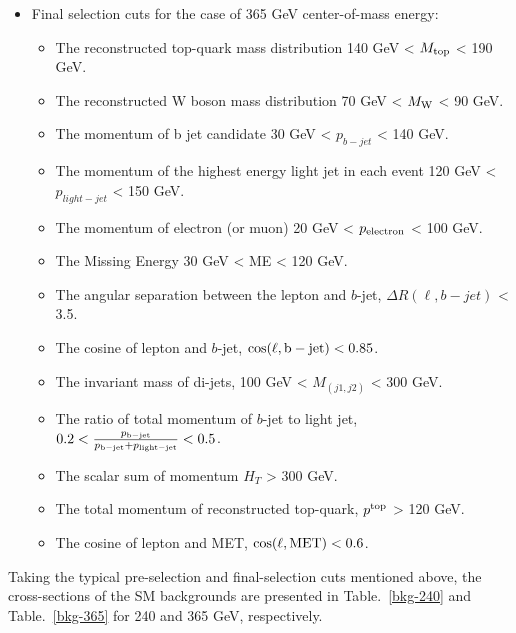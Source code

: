 \documentclass[11pt,onecolumn,english,showpacs,preprintnumbers,amsmath,amssymb,floatfix,nofootinbib]{revtex4-1}
\begin{document}
\begin{itemize}
\item Final selection cuts for the case of 365 GeV center-of-mass energy:
\begin{itemize}
\item The reconstructed top-quark mass distribution 140 GeV < $M_{\rm top}$ < 190 GeV.   
\item The reconstructed W boson mass distribution  70 GeV < $M_{\rm W}$ < 90 GeV.      
\item The momentum of b jet candidate  30 GeV < $p_{b-jet}$ < 140 GeV. 
\item The momentum of the highest energy light jet in each event 120 GeV < $p_{light-jet}$ < 150 GeV.
\item The momentum of electron (or muon)  20 GeV < $p_{\rm electron}$ < 100 GeV.   
\item The Missing Energy 30 GeV < ME < 120 GeV.   
\item The angular separation between the lepton and $b$-jet,  $\Delta R (\ell, b-jet)$ < 3.5.
\item The cosine of lepton and $b$-jet, $\cos(\ell, \rm b-jet) < 0.85$.
\item The invariant mass of di-jets, 100 GeV < $M_{(j1, j2)}$ < 300 GeV.
\item The ratio of total momentum of  $b$-jet to light jet, $0.2 <   \frac{p_{\rm b-jet}}{p_{\rm b-jet}+p_{\rm light-jet}} < 0.5$.
\item The scalar sum of momentum $H_T$ > 300 GeV.
\item The total momentum of reconstructed top-quark, $p^{\rm top}$ > 120 GeV.
\item The cosine of lepton and MET, $\cos(\ell, \rm MET) < 0.6$.
\end{itemize}
\end{itemize}


Taking the typical pre-selection and final-selection cuts mentioned above, 
the cross-sections of the SM backgrounds 
are presented in Table.~\ref{bkg-240} and Table.~\ref{bkg-365}
for 240 and 365 GeV, respectively. 
\end{document}
